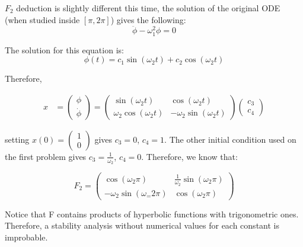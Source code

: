 \documentclass[
course = {{ITVO}},
quartile = {{1}},
assignment = 6,
name = {{Samir Salmen}},
studentnumber = {{NUSP: 11298636}},
email = {{samir.salmen@usp.br}},
firstexercise = 1
]{aga-homework}
\begin{document}
			$F_2$ deduction is slightly different this time, the solution of the original ODE (when studied inside $[\pi, 2\pi]$) gives the following:
			\begin{equation}
				\ddot{\phi} - \omega_1^2\phi = 0
			\end{equation}
			
			The solution for this equation is:
			\begin{equation}
				\phi(t) = c_1\sin(\omega_2 t) + c_2\cos(\omega_2 t)
			\end{equation}
			
			Therefore, 
			
			\begin{align}
				x &= \begin{pmatrix}
					\phi\\
					\dot{\phi}
				\end{pmatrix}
				= 		
				\begin{pmatrix}
					\sin(\omega_2 t) & \cos(\omega_2 t)\\
					\omega_2\cos(\omega_2 t) & -\omega_2\sin(\omega_2 t)
				\end{pmatrix} 
				\begin{pmatrix}
					c_3\\
					c_4
				\end{pmatrix}
			\end{align}
			
		
			
			setting 
			$
			x(0) = \begin{pmatrix}
				1\\
				0
			\end{pmatrix}	
			$ 
			gives $c_3 = 0$, $c_4 = 1$. The other initial condition used on the first problem gives $c_3 = \frac{1}{\omega_2}$, $c_4 = 0$. Therefore, we know that:
			
			\begin{equation}
				F_2 = \begin{pmatrix}\cos(\omega_2\pi) & \frac{1}{\omega_2}\sin(\omega_2\pi)\\ -\omega_2\sin(\omega_=2\pi) &  \cos(\omega_2\pi) \end{pmatrix}
			\end{equation}
			
			Notice that F contains products of hyperbolic functions with trigonometric ones. Therefore, a stability analysis without numerical values for each constant is improbable.
			
			
			
			
			
\end{document}
